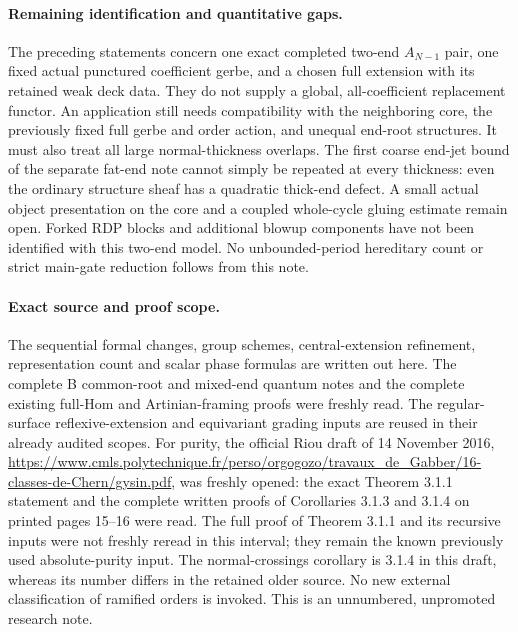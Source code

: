 \paragraph{Remaining identification and quantitative gaps.}
The preceding statements concern one exact completed two-end
$A_{N-1}$ pair, one fixed actual punctured coefficient gerbe, and
a chosen full extension with its retained weak deck data.  They
do not supply a global, all-coefficient replacement functor.
An application still needs compatibility with the neighboring core,
the previously fixed full gerbe and order action, and unequal
end-root structures.  It must also treat all large normal-thickness
overlaps.  The first coarse end-jet bound of the separate fat-end
note cannot simply be repeated at every thickness: even the
ordinary structure sheaf has a quadratic thick-end defect.
A small actual object presentation on the core and a coupled
whole-cycle gluing estimate remain open.  Forked RDP blocks and
additional blowup components have not been identified with this
two-end model.  No unbounded-period hereditary count or strict
main-gate reduction follows from this note.

\paragraph{Exact source and proof scope.}
The sequential formal changes, group schemes, central-extension
refinement, representation count and scalar phase formulas are
written out here.  The complete B common-root and mixed-end quantum
notes and the complete existing full-Hom and Artinian-framing proofs
were freshly read.  The regular-surface reflexive-extension and
equivariant grading inputs are reused in their already audited scopes.
For purity, the official Riou draft of 14 November 2016,
\url{https://www.cmls.polytechnique.fr/perso/orgogozo/travaux_de_Gabber/16-classes-de-Chern/gysin.pdf},
was freshly opened: the exact Theorem 3.1.1 statement and the
complete written proofs of Corollaries 3.1.3 and 3.1.4 on printed
pages 15--16 were read.  The full proof of Theorem 3.1.1 and its
recursive inputs were not freshly reread in this interval; they
remain the known previously used absolute-purity input.  The
normal-crossings corollary is 3.1.4 in this draft, whereas its
number differs in the retained older source.  No new external
classification of ramified orders is invoked.  This is an unnumbered,
unpromoted research note.

